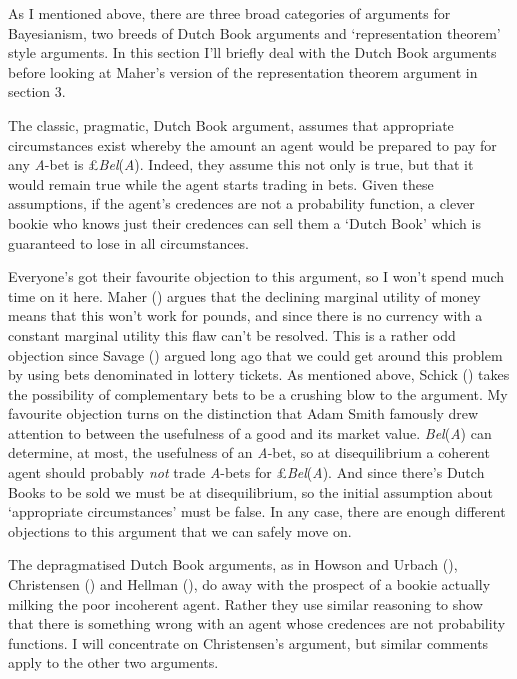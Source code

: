 \documentclass[
  11pt,
  letterpaper,
  DIV=11,
  numbers=noendperiod,
  twoside]{scrartcl}
\begin{document}
As I mentioned above, there are three broad categories of arguments for
Bayesianism, two breeds of Dutch Book arguments and `representation
theorem' style arguments. In this section I'll briefly deal with the
Dutch Book arguments before looking at Maher's version of the
representation theorem argument in section 3.

The classic, pragmatic, Dutch Book argument, assumes that appropriate
circumstances exist whereby the amount an agent would be prepared to pay
for any \emph{A}-bet is £\emph{Bel}(\emph{A}). Indeed, they assume this
not only is true, but that it would remain true while the agent starts
trading in bets. Given these assumptions, if the agent's credences are
not a probability function, a clever bookie who knows just their
credences can sell them a `Dutch Book' which is guaranteed to lose in
all circumstances.

Everyone's got their favourite objection to this argument, so I won't
spend much time on it here. Maher ()
argues that the declining marginal utility of money means that this
won't work for pounds, and since there is no currency with a constant
marginal utility this flaw can't be resolved. This is a rather odd
objection since Savage () argued long ago
that we could get around this problem by using bets denominated in
lottery tickets. As mentioned above, Schick
() takes the possibility of complementary
bets to be a crushing blow to the argument. My favourite objection turns
on the distinction that Adam Smith famously drew attention to between
the usefulness of a good and its market value. \emph{Bel}(\emph{A}) can
determine, at most, the usefulness of an \emph{A}-bet, so at
disequilibrium a coherent agent should probably \emph{not} trade
\emph{A}-bets for £\emph{Bel}(\emph{A}). And since there's Dutch Books
to be sold we must be at disequilibrium, so the initial assumption about
`appropriate circumstances' must be false. In any case, there are enough
different objections to this argument that we can safely move on.

The depragmatised Dutch Book arguments, as in Howson and Urbach
(), Christensen
() and Hellman
(), do away with the prospect of a
bookie actually milking the poor incoherent agent. Rather they use
similar reasoning to show that there is something wrong with an agent
whose credences are not probability functions. I will concentrate on
Christensen's argument, but similar comments apply to the other two
arguments.
\end{document}
